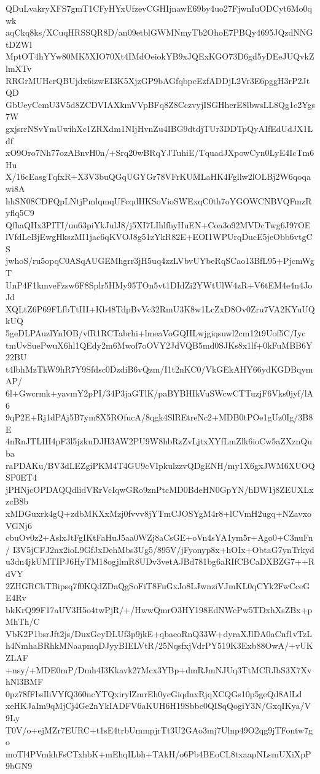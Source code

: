 QDuLvakryXFS7gmT1CFyHYxUfzevCGHIjnawE69by4uo27FjwnIuODCyt6Mo0qwk
aqCkq8ks/XCuqHRSSQR8D/an09etblGWMNmyTb2OhoE7PBQy4695JQzdNNGtDZWl
MptOT4hYYw80MK5XIO70Xt4IMdOeiokYB9xJQExKGO73D6gd5yDEeJUQvkZlmXTv
RRGrMUHcrQBUjdx6izwEI3K5XjzGP9bAGfqbpeEzfADDjL2Vr3E6pggH3rP2JtQD
GbUeyCcmU3V5d8ZCDVIAXkmVVpBFq8Z8CczvyjISGHherE8lbwsLL8Qg1c2Ygs7W
gxjsrrNSvYmUwihXc1ZRXdm1NIjHvnZu4IBG9dtdjTUr3DDTpQyAIfEdUdJX1Ldf
xO9Oro7Nh77ozABnvH0n/+Srq20wBRqYJTuhiE/TquadJXpowCyn0LyE4IcTm6Hu
X/16cEasgTqfxR+X3V3buQGqUGYGr78VFrKUMLaHK4Fgllw2lOLBj2W6qoqawi8A
hhSN08CDFQpLNtjPmlqmqUFcqdHKSoVioSWExqC0th7oYGOWCNBVQFmzRyflq5C9
QfhaQHx3PITI/uu63piYkJulJ8/j5XI7LIhlfhyHuEN+Coa3o92MVDcTwg6J97OE
lVfdLeBjEwgHkszMI1jac6qKVOJ8g51zYkR82E+EOI1WPUrqDucE5jeObb6vtgCS
jwhoS/ru5opqC0ASqAUGEMhgrr3jH5uq4zzLVbvUYbeRqSCao13BfL95+PjcmWgT
UnP4F1kmveFzsw6F8Splr5HMy95TOn5vt1DIdZi2YWtUlW4zR+V6tEM4e4n4JoJd
XQLtZ6P69FLfbTtIII+Kb48TdpBvVc32RmU3K8w1LcZxD8Ov0Zru7VA2KYuUQkUQ
5geDLPAuzlYnIOB/vfR1RCTabrhi+lmeaVoGQHLwjgiqsuwl2cm12t9Uof5C/Iyc
tmUvSuePwuX6hl1QEdy2m6Mwof7oOVY2JdVQB5md0SJKs8x1lf+0kFuMBB6Y22BU
t4lbhMzTkW9hR7Y9Sfdsc0DzdiB6vQzm/I1t2nKC0/VkGEkAHY66ydKGDBqymAP/
6l+Gwcrmk+yavmY2pPI/34P3jaGTlK/paBYBHIkVuSWcwCTTuzjF6Vks0jyf/lA6
9qP2E+Rj1dPAj5B7ym8X5ROfucA/8qgk4SlREtreNc2+MDB0tPOe1gUz0Ig/3B8E
4nRnJTLIH4pF3l5jzkuDJH3AW2PU9W8hbRzZvLjtxXYfLmZlk6ioCw5aZXznQuba
raPDAKu/BV3dLEZgiPKM4T4GU9cVIpkulzzvQDgENH/my1X6gxJWM6XUOQSP0ET4
jPHNjcOPDAQQdlidVRrVcIqwGRo9znPtcMD0BdeHN0GpYN/hDW1j8ZEUXLxzcB8b
xMDGuxrk4gQ+zdbMKXxMzj0fvvv8jYTmCJOSYgM4r8+lCVmH2ugq+NZavxoVGNj6
cbuOv0z2+AslxJtFgIKtFaHuJ5aa0WZj8aCsGE+oVn4sYA1ym5r+Ago0+C3nuFn/
I3V5jCFJ2nx2ioL9GfJxDehMbs3Ug5/895V/jFyonyp8x+hOIx+ObtaG7ynTrkyd
u3dn4jkUMTIPJ6HyTM18ogjlmR8UDv3vetAJBd781bg6aRIfCBCaDXBZG7++RdVY
2ZHGRChTBipsq7f0KQdZDaQgSoFiT8FuGxJo8LJwnziVJmKL0qCYk2FwCceGE4Rv
bkKrQ99F17aUV3H5o4twPjR/+/HwwQmrO3HY198EdNWcPw5TDxhXsZBx+pMhTh/C
VbK2P1bsrJft2js/DuxGeyDLUf3p9jkE+qbaeoRnQ33W+dyraXJlDA0aCnf1vTzL
h4NmhaBRhkMNaapmqDJyyBIELVtR/25NqsfxjVdrPY519K3Exb88OwA/+vUKZLAF
+nsy/+MDE0mP/Dmh4I3Kkavk27Mcx3YBp+dmRJmNJUq3TtMCRJbS3X7XvhNl3BMF
0pz78fFbsIliVYfQ360ncYTQxirylZmrEh0ycGiqdnxRjqXCQGs10p5geQd8AlLd
xeHKJaIm9qMjCj4Ge2nYkIADFV6aKUH6H19Sbbc0QISqQogiY3N/GxqIKya/V9Ly
T0V/o+ejMZr7EURC+t1sE4trbUmmpjrTt3U2GAo3mj7Ulnp49O2qg9jTFontw7go
moTl4PVmkhFsCTxhbK+mEhqILbh+TAkH/o6Pb4BEoCL8txaapNLsmUXiXpP9bGN9
